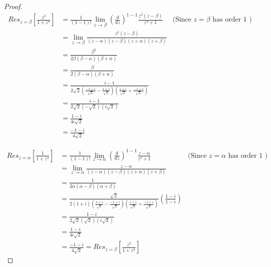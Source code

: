 \documentclass{article}
\begin{document}
\begin{proof}
    \begin{align*}
        Res_{z = \beta}\left[\frac{z^2}{1 + z^4}\right] &= \frac{1}{(1 - 1)!} \lim_{z \to \beta} \left(\frac{d}{dz}\right)^{1 - 1}  \frac{z^2 (z - \beta)}{z^4 + 1} & \text{(Since $z = \beta$ has order 1 )} \\
        &= \lim_{z \to \beta} \frac{z^2 (z - \beta)}{(z - \alpha)(z - \beta)(z + \alpha)(z + \beta)} \\
        &= \frac{\beta^2}{2 \beta (\beta - \alpha)(\beta + \alpha)} \\
        &= \frac{\beta}{2 (\beta - \alpha)(\beta + \alpha)} \\
        &= \frac{i - 1}{2\sqrt{2}\left(\frac{-1 + i}{\sqrt{2}} - \frac{1 + i}{\sqrt{2}}\right)\left(\frac{1 + i}{\sqrt{2}} + \frac{-1 + i}{\sqrt{2}}\right)} \\
        &= \frac{i - 1}{2\sqrt{2}\left(-\sqrt{2}\right)\left(i\sqrt{2}\right)} \\
        &= \frac{1 - i}{4i\sqrt{2}} \\
        &= \frac{-1 - i}{4\sqrt{2}}
    \end{align*}

    \begin{align*}
        Res_{z = \alpha}\left[\frac{1}{1 + z^4}\right] &= \frac{1}{(1 - 1)!} \lim_{z \to \alpha} \left(\frac{d}{dz}\right)^{1 - 1}  \frac{z - \alpha}{z^4 + 1} & \text{(Since $z = \alpha$ has order 1 )} \\
        &= \lim_{z \to \alpha} \frac{z - \alpha}{(z - \alpha)(z - \beta)(z + \alpha)(z + \beta)} \\
        &= \frac{1}{2\alpha(\alpha - \beta)(\alpha + \beta)} \\
        &= \frac{\sqrt{2}}{2 (1 + i) \left(\frac{1 + i}{\sqrt{2}} - \frac{-1 + i}{\sqrt{2}}\right)\left(\frac{1 + i}{\sqrt{2}} + \frac{-1 + i}{\sqrt{2}}\right)} \left(\frac{1 - i}{1 - i}\right) \\
        &= \frac{1 - i}{2\sqrt{2}\left(\sqrt{2}\right)\left(i\sqrt{2}\right)} \\
        &= \frac{1 - i}{4i\sqrt{2}} \\
        &= \frac{-1 - i}{4 \sqrt{2}} = Res_{z = \beta}\left[\frac{z^2}{1 + z^4}\right]
    \end{align*}


\end{proof}
\end{document}
